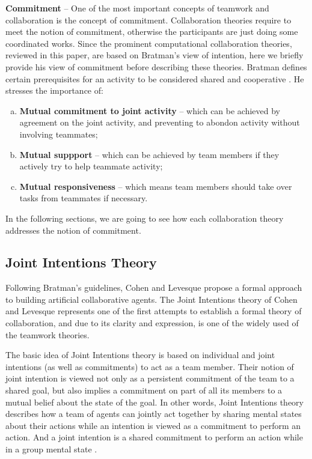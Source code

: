 \documentclass[11pt]{article}
\begin{document}
\textbf{Commitment} -- One of the most important concepts of teamwork and
collaboration is the concept of commitment. Collaboration theories require to
meet the notion of commitment, otherwise the participants are just doing some
coordinated works. Since the prominent computational collaboration theories,
reviewed in this paper, are based on Bratman's view of intention, here we
briefly provide his view of commitment before describing these theories. Bratman
defines certain prerequisites for an activity to be considered shared and
cooperative \cite{bratman:shared-activity}. He stresses the importance of:

\begin{enumerate}[a)]
  \item \textbf{Mutual commitment to joint activity} -- which can be achieved by
  agreement on the joint activity, and preventing to abondon activity without
  involving teammates;
  \item \textbf{Mutual suppport} -- which can be achieved by team members
  if they actively try to help teammate activity;
  \item \textbf{Mutual responsiveness} -- which means team members should take
  over tasks from teammates if necessary.
\end{enumerate}

In the following sections, we are going to see how each collaboration theory
addresses the notion of commitment.

\subsection{Joint Intentions Theory}
\label{sec:joint-intentions}

Following Bratman's guidelines, Cohen and Levesque propose a formal approach to
building artificial collaborative agents. The Joint Intentions theory of Cohen
and Levesque \cite{cohen:teamwork, cohen:intention-commitment,
cohen:persistence-intention-commitment, cohen:intentions,
levesque:acting-together} represents one of the first attempts to establish a
formal theory of collaboration, and due to its clarity and expression, is one of
the widely used of the teamwork theories. 

The basic idea of Joint Intentions theory is based on individual and joint
intentions (as well as commitments) to act as a team member. Their notion of
joint intention is viewed not only as a persistent commitment of the team to a
shared goal, but also implies a commitment on part of all its members to a
mutual belief about the state of the goal. In other words, Joint Intentions
theory describes how a team of agents can jointly act together by sharing mental
states about their actions while an intention is viewed as a commitment to
perform an action. And a joint intention is a shared commitment to perform an
action while in a group mental state \cite{cohen:intention-commitment}. 
\end{document}
